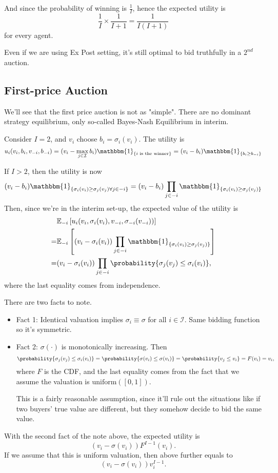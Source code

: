 And since the probability of winning is \(\frac{1}{I}\), hence the expected utility is
\[
	\frac{1}{I}\times \frac{1}{I+1} = \frac{1}{I(I + 1)}
\]
for every agent.

\begin{note}
	Even if we are using Ex Post setting, it's still optimal to bid truthfully in a \(2^{nd}\) auction.
\end{note}

\subsection{First-price Auction}
We'll see that the first price auction is not as "simple". There are no dominant strategy equilibrium, only so-called
Bayes-Nash Equilibrium in interim.

\hr

Consider \(I = 2\), and \(v_{i}\) choose \(b_{i} = \sigma_{i}(v_{i})\). The utility is
\[
	u_{i}(v_{i}, b_{i}, v_{-i}, b_{-i}) = (v_{i} - \max_{j\in \mathcal{I} }b_{i})\mathbbm{1}_{\{ i \text{ is the winner} \}} = (v_{i} - b_{i})\mathbbm{1}_{\{ b_{i}\geq b_{-i} \}}
\]

If \(I>2\), then the utility is now
\[
	(v_{i} - b_{i})\mathbbm{1}_{\{ \sigma_{i}(v_{i})\geq \sigma_{j}(v_{j})\forall j\in -i \}} = (v_{i} - b_{i})\prod\limits_{j\in -i} \mathbbm{1}_{\{ \sigma_{i}(v_{i})\geq \sigma_{j}(v_{j}) \}}
\]
Then, since we're in the interim set-up, the expected value of the utility is
\[
	\begin{split}
		&\mathbb{\MakeUppercase{E}}_{-i}\left[u_{i}(v_{i}, \sigma_{i}(v_{i}), v_{-i}, \sigma_{-i}(v_{-i}))\right]\\
		= &\mathbb{\MakeUppercase{E}}_{-i}\left[(v_{i} - \sigma_{i}(v_{i})) \prod\limits_{j\in -i}\mathbbm{1}_{\{ \sigma_{i}(v_{i})\geq \sigma_{j}(v_{j}) \}}  \right]\\
		= &(v_{i} - \sigma_{i}(v_{i}))\prod\limits_{j\in -i}\probability{\sigma_{j}(v_{j})\leq \sigma_{i}(v_{i})},
	\end{split}
\]
where the last equality comes from independence.

\begin{note}
	There are two facts to note.
	\begin{itemize}
		\item Fact 1: Identical valuation implies \(\sigma_{i} \equiv \sigma\) for all \(i\in \mathcal{I} \). Same bidding function so it's symmetric.
		\item Fact 2: \(\sigma(\cdot)\) is monotonically increasing. Then
		      \[
			      \probability{\sigma_{j}(v_{j})\leq \sigma_{i}(v_{i})} = \probability{\sigma(v_{i})\leq \sigma(v_{i})} = \probability{v_{j}\leq v_{i}} = F(v_{i}) = v_{i},
		      \]
		      where \(F\) is the CDF, and the last equality comes from the fact that we assume the valuation is \(\mathrm{uniform}([0, 1])\).

		      This is a fairly reasonable assumption, since it'll rule out the situations like if two buyers' true value are different, but they somehow decide to bid
		      the same value.
	\end{itemize}
\end{note}

With the second fact of the note above, the expected utility is
\[
	(v_{i} - \sigma(v_{i})) F^{I-1}(v_{i}).
\]
If we assume that this is uniform valuation, then above further equals to
\[
	(v_{i} - \sigma(v_{i}))v^{I-1}_{i}.
\]